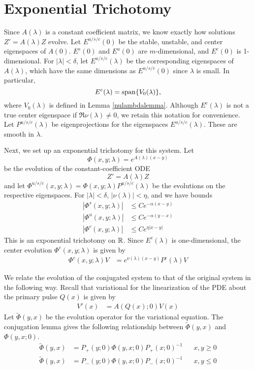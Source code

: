 \documentclass[thesis.tex]{subfiles}
\begin{document}
\section{Exponential Trichotomy}

Since $A(\lambda)$ is a constant coefficient matrix, we know exactly how solutions $Z' = A(\lambda)Z$ evolve. Let $E^{u/s/c}(0)$ be the stable, unstable, and center eigenspaces of $A(0)$. $E^s(0)$ and $E^u(0)$ are $m$-dimensional, and $E^c(0)$ is 1-dimensional. For $|\lambda| < \delta$, let $E^{u/s/c}(\lambda)$ be the corresponding eigenspaces of $A(\lambda)$, which have the same dimensions as $E^{u/s/c}(0)$ since $\lambda$ is small. In particular, 
\[
E^c(\lambda) = \operatorname{span}\{ V_0(\lambda) \},
\]
where $V_0(\lambda)$ is defined in Lemma \ref{nulambdalemma}. Although $E^c(\lambda)$ is not a true center eigenspace if $\Re \nu(\lambda) \neq 0$, we retain this notation for convenience. Let $P^{u/s/c}(\lambda)$ be eigenprojections for the eigenspaces $E^{u/s/c}(\lambda)$. These are smooth in $\lambda$. 

Next, we set up an exponential trichotomy for this system. Let
\begin{equation}
\Phi(x, y; \lambda) = e^{A(\lambda)(x-y)}
\end{equation}
be the evolution of the constant-coefficient ODE
\[
Z' = A(\lambda) Z
\]
and let $\Phi^{u/s/c}(x, y; \lambda) = \Phi(x, y; \lambda)P^{u/s/c}(\lambda)$ be the evolutions on the respective eigenspaces. For $|\lambda| < \delta$, $|\nu(\lambda)| < \eta$, and we have bounds
\begin{equation}\label{Zevolbounds}
\begin{aligned}
|\Phi^s(x, y; \lambda)| &\leq C e^{-\alpha(x - y)} \\
|\Phi^u(x, y; \lambda)| &\leq C e^{-\alpha(y - x)} \\
|\Phi^c(x, y; \lambda)| &\leq C e^{\eta|x - y|} 
\end{aligned}
\end{equation}
This is an exponential trichotomy on $\mathbb{R}$. Since $E^c(\lambda)$ is one-dimensional, the center evolution $\Phi^c(x, y; \lambda)$ is given by
\begin{align}\label{centerevol}
\Phi^c(x, y; \lambda) V &= e^{\nu(\lambda)(x - y)} P^c(\lambda)V
\end{align}

We relate the evolution of the conjugated system to that of the original system in the following way. Recall that variational for the linearization of the PDE about the primary pulse $Q(x)$ is given by 
\begin{align}\label{vareqstab}
V'(x) &= A(Q(x); 0) V(x)
\end{align}
Let $\tilde{\Phi}(y, x)$ be the evolution operator for the variational equation. The conjugation lemma gives the following relationship between $\tilde{\Phi}(y, x)$ and $\Phi(y, x; 0)$.
\begin{align*}
\tilde{\Phi}(y, x) &= P_+(y; 0) \Phi(y, x; 0) P_+(x; 0)^{-1} && x, y \geq 0 \\
\tilde{\Phi}(y, x) &= P_-(y; 0) \Phi(y, x; 0) P_-(x; 0)^{-1} && x, y \leq 0
\end{align*}
\end{document}
